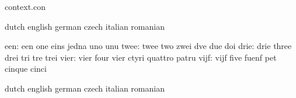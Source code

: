 



\startlogginginterface context.con



\startvariables            dutch                     english
                           german                    czech
                           italian                   romanian

                      een: een                       one
                           eins                      jedna
                           uno                       unu
                     twee: twee                      two
                           zwei                      dve
                           due                       doi
                     drie: drie                      three
                           drei                      tri
                           tre                       trei
                     vier: vier                      four
                           vier                      ctyri
                           quattro                   patru
                     vijf: vijf                      five
                           fuenf                     pet
                           cinque                    cinci
\stopvariables




\startvariables            dutch                     english
                           german                    czech
                           italian                   romanian

